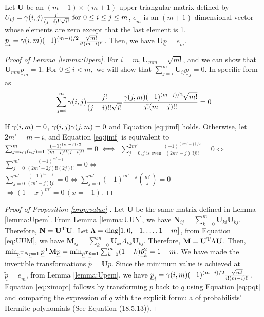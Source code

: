 \documentclass[appliedmath,article,accept,pdftex,moreauthors]{Definitions/mdpi}
\begin{document}
\begin{Lemma}\label{lemma:Upem}
Let $\mathbf{U}$ be an $(m+1) \times (m+1)$ upper triangular matrix defined by\linebreak
$U_{ij} = \gamma(i,j) \frac{j!}{(j-i)!!\sqrt{i!}} \textrm{ for } 0 \leq i\leq j \leq m$, $\underline{e}_m$ is an $(m+1)$ dimensional vector whose elements are zero except that the last element is 1. $\underline{p}_i = \gamma(i,m) (-1)^{(m-i)/2}\frac{\sqrt{m!}}{i!(m-i)!!}$.
Then, we have $ \mathbf{U} \underline{p} = \underline{e}_m$.
\end{Lemma}
\begin{proof}[Proof of Lemma \ref{lemma:Upem}]
    For $ i = m, \mathbf{U}_{mm} = \sqrt{m!}$, and we can show that $\mathbf{U}_{mm} \underline{p}_m = 1 $. For $ 0\leq i < m, $ we
    will show that $ \sum_{j=i}^m \mathbf{U}_{ij} \underline{p}_j = 0 $. In specific form as
    \begin{equation}\label{eq:jimf}
    \sum_{j=i}^m \gamma(i,j) \frac{j!}{(j-i)!!\sqrt{i!}}  \frac{\gamma(j,m)(-1)^{(m-j)/2}\sqrt{m!}}{j!(m-j)!!} = 0
    \end{equation}
    
    {If} $ \gamma(i,m) = 0$, $\gamma(i,j)\gamma(j,m) = 0$ and Equation \eqref{eq:jimf} holds. Otherwise, let $2m' = m - i$,    
    and Equation \eqref{eq:jimf} is equivalent to
    $ \sum_{j=i, \gamma(i,j)=1}^m  \frac{(-1)^{(m-j)/2}}{(m-j)!!(j-i)!!}  = 0  \iff  $
    $\sum_{j=0, j \textrm{ is even}}^{2m'}  \frac{(-1)^{(2m'-j)/2}}{(2m'-j)!! j!!}= 0  \iff $
    $\sum_{j=0}^{m'}  \frac{(-1)^{m'-j}}{(2m'-2j)!! (2j)!!} = 0  \iff $
    $\sum_{j=0}^{m'}  \frac{(-1)^{m'-j}}{(m'-j)! j!} = 0  \iff \sum_{j=0}^{m'} (-1)^{m'-j} \binom{m'}{j} = 0$
    $ \iff (1+x)^{m'} = 0 \,(x=-1)$.
\end{proof}
\begin{proof}[Proof of Proposition \ref{prop:value} ]
    Let $\mathbf{U}$ be the same matrix defined in Lemma \ref{lemma:Upem}. From Lemma \ref{lemma:UUN}, we have $\mathbf{N}_{ij} = \sum_{k=0}^m \mathbf{U}_{ki}\mathbf{U}_{kj}$. Therefore, $\mathbf{N} = \mathbf{U}^{\mathrm{T}}\mathbf{U}$. Let $\Lambda = \operatorname*{diag}[1, 0, -1, \dots, 1-m]$, from Equation \eqref{eq:UUM}, we have $\mathbf{M}_{ij} = \sum_{k=0}^m \mathbf{U}_{ki}\Lambda_{kk}\mathbf{U}_{kj}$. Therefore, $\mathbf{M} = \mathbf{U}^{\mathrm{T}}\Lambda\mathbf{U}$. Then, $\min_{\underline{p}^{\mathrm{T}} N \underline{p} = 1} \underline{p}^{\mathrm{T}} \mathbf{M}\underline{p} = \min_{\underline{\tilde{p}}^{\mathrm{T}}\underline{\tilde{p}} = 1} \sum_{k=0}^m (1-k)\underline{\tilde{p}}_k^2 = 1-m$. We have made the invertible transformations $\underline{\tilde{p}} = \mathbf{U}\underline{p}$. Since the minimum value is achieved at $\underline{\tilde{p}} = \underline{e}_m$, from Lemma \ref{lemma:Upem}, we have $\underline{p}_i = \gamma(i,m) (-1)^{(m-i)/2}\frac{\sqrt{m!}}{i!(m-i)!!}$. Equation \eqref{eq:ximopt} follows by transforming $\underline{p}$ back to $\underline{q}$ using Equation \eqref{eq:pqt} and comparing the expression of $\underline{q}$ with the explicit formula of probabilists' Hermite polynomials (See \cite {NIST:DLMF} Equation (18.5.13)). %

\end{proof}
\end{document}
